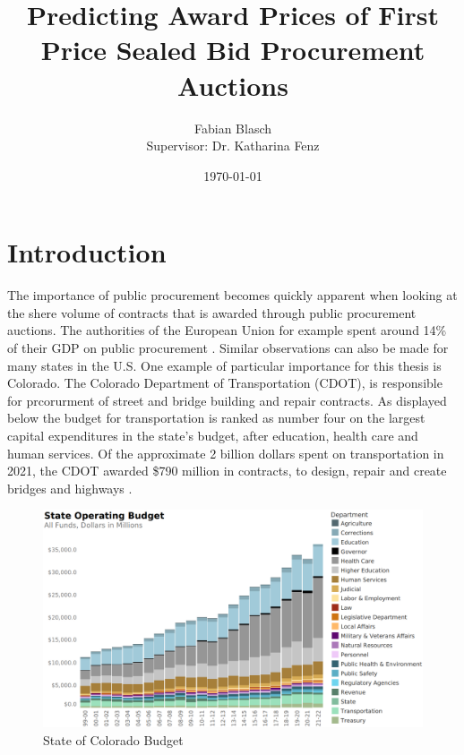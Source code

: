 \documentclass[a4paper,12pt, headsepline]{scrartcl}
\title{Predicting Award Prices of First Price Sealed Bid Procurement Auctions}
\date{\today}
\author{Fabian Blasch\\[0.4cm]{Supervisor: Dr. Katharina Fenz}}
\numberwithin{equation}{section}
\begin{document}
\begin{titlingpage}
\maketitle
\end{titlingpage}
\newpage
\tableofcontents
\thispagestyle{empty}
\clearpage
{} 

\section{Introduction}\label{sec:int}
The importance of public procurement becomes quickly apparent when looking at the shere volume of contracts that is awarded through public procurement auctions. The authorities of the European Union for example spent around 14\% of their GDP on public procurement \citet{GarciaRodriguez2020}. Similar observations can also be made for many states in the U.S. One example of particular importance for this thesis is Colorado. The Colorado Department of Transportation (CDOT), is responsible for prcorurment of street and bridge building and repair contracts. As displayed below the budget for transportation is ranked as number four on the largest capital expenditures in the state's budget, after education, health care and human services. Of the approximate 2 billion dollars spent on transportation in 2021, the CDOT awarded \$790 million in contracts, to design, repair and create bridges and highways \citep{CDOTPRes}.

\begin{figure}[H]
	\includegraphics[width = 14	cm]{figures/Colorado_Budget.PNG}
	\caption{State of Colorado Budget}\label{fig:bud}
\end{figure}
\end{document}

